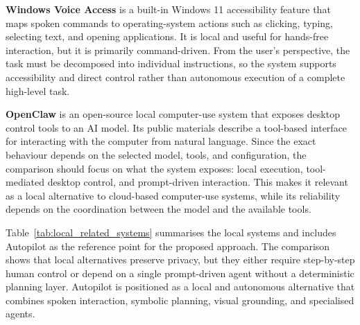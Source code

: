 \noindent\textbf{Windows Voice Access} \cite{windows_voice_access} is a built-in Windows 11 accessibility feature that maps spoken commands to operating-system actions such as clicking, typing, selecting text, and opening applications. It is local and useful for hands-free interaction, but it is primarily command-driven. From the user's perspective, the task must be decomposed into individual instructions, so the system supports accessibility and direct control rather than autonomous execution of a complete high-level task.

\noindent\textbf{OpenClaw} \cite{openclaw} is an open-source local computer-use system that exposes desktop control tools to an AI model. Its public materials describe a tool-based interface for interacting with the computer from natural language. Since the exact behaviour depends on the selected model, tools, and configuration, the comparison should focus on what the system exposes: local execution, tool-mediated desktop control, and prompt-driven interaction. This makes it relevant as a local alternative to cloud-based computer-use systems, while its reliability depends on the coordination between the model and the available tools.

Table~\ref{tab:local_related_systems} summarises the local systems and includes Autopilot as the reference point for the proposed approach. The comparison shows that local alternatives preserve privacy, but they either require step-by-step human control or depend on a single prompt-driven agent without a deterministic planning layer. Autopilot is positioned as a local and autonomous alternative that combines spoken interaction, symbolic planning, visual grounding, and specialised agents.

\begin{table}[H]
\centering
{\small
\renewcommand{\arraystretch}{1.15}
}
\caption{Positioning of local desktop automation systems and Autopilot.}
\label{tab:local_related_systems}
\end{table}

